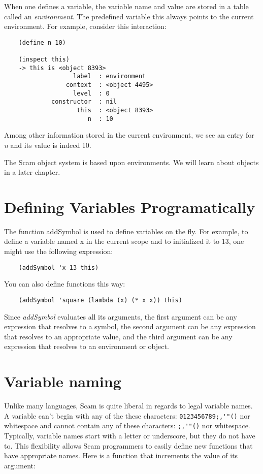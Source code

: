 When one defines a variable, the variable name and value are
stored in a table called an {\it environment}. The predefined
variable this always points to the current environment.
For example, consider this interaction:

\begin{verbatim}
    (define n 10)

    (inspect this)
    -> this is <object 8393>
                   label  : environment
                 context  : <object 4495>
                   level  : 0
             constructor  : nil
                    this  : <object 8393>
                       n  : 10
\end{verbatim}

Among other information stored in the current environment,
we see an entry for {\it n} and its value is indeed 10.

The Scam object system is based upon environments. We will
learn about objects in a later chapter.

\section{Defining Variables Programatically}

The function addSymbol is used to define variables on the 
fly. For example, to define a variable named x in the current
scope and to initialized it to 13, one might use the
following expression:

\begin{verbatim}
    (addSymbol 'x 13 this)
\end{verbatim}

You can also define functions this way:

\begin{verbatim}
    (addSymbol 'square (lambda (x) (* x x)) this)
\end{verbatim}

Since {\it addSymbol} evaluates all its arguments, the first
argument can be any expression that resolves to a symbol,
the second argument can be any expression that resolves
to an appropriate value, and the third argument can
be any expression that resolves to an environment or
object.

\section{Variable naming}

Unlike many languages,
Scam is quite liberal in regards to legal variable names.
A variable can't begin with any of the these characters:
\verb!0123456789;,'"()! nor whitespace and cannot contain any of these
characters: \verb!;,'"()! nor whitespace. Typically,
variable names start with a letter or underscore, but
they do not have to. This flexibility allows Scam programmers
to easily define new functions that have appropriate names.
Here is a function that increments the value of its argument:


